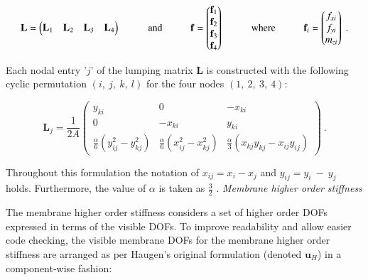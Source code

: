 \begin{equation} 
\mathbf{L} =
\begin{pmatrix}
\mathbf{L}_1 & \mathbf{L}_2 & \mathbf{L}_3 & \mathbf{L}_4
\end{pmatrix}
\hspace{10mm}
\text{and}
\hspace{10mm}
\mathbf{f} =
\begin{pmatrix}
\mathbf{f}_1 \\
\mathbf{f}_2 \\
\mathbf{f}_3 \\
\mathbf{f}_4
\end{pmatrix}
\hspace{10mm}
\text{where}
\hspace{10mm}
\mathbf{f}_i =
\begin{pmatrix}
{f_{xi}} \\
{f_{yi}} \\
{m_{zi}}
\end{pmatrix}
\label{equation06}\ .
\end{equation}

Each nodal entry '$j$' of the lumping matrix $\mathbf{L}$ is constructed with the following cyclic permutation $(i,\ j,\ k,\ l)$ for the four nodes $(1,\ 2,\ 3,\ 4)$:

\begin{equation} 
\mathbf{L}_j = \frac{1}{2 A}
\begin{pmatrix}
y_{ki} & 0 & -x_{ki} \\
0 & -x_{ki} & y_{ki} \\
\frac{\alpha}{6}(y_{ij}^2 - y_{kj}^2 ) & \frac{\alpha}{6}(x_{ij}^2 - x_{kj}^2 ) & \frac{\alpha}{3}(x_{kj}y_{kj} - x_{ij}y_{ij})
\end{pmatrix}
\label{equation07}\ .
\end{equation}

Throughout this formulation the notation of $x_{ij} = x_i - x_j$ and $y_{ij} = y_i\ -\ y_j$ holds. Furthermore, the value of $\alpha$ is taken as $\frac{3}{2}$ \cite{Fel91}.
\newpage
\textit{Membrane higher order stiffness}

The membrane higher order stiffness considers a set of higher order DOFs expressed in terms of the visible DOFs. To improve readability and allow easier code checking, the visible membrane DOFs for the membrane higher order stiffness are arranged as per Haugen's original formulation \cite{Hau94} (denoted $\mathbf{u}_H$) in a component-wise fashion:

